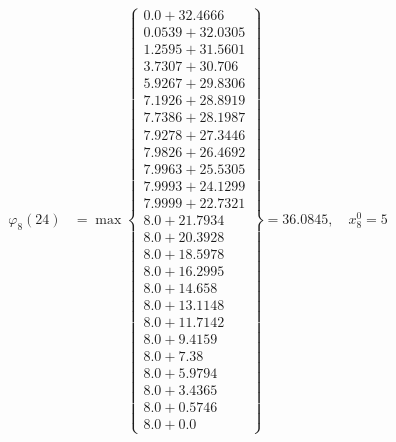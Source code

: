 \documentclass{article}
\begin{document}
\begin{align*}
\varphi_{8}(24) &= \max \left\{ \begin{array}{c}
0.0 + 32.4666 \\
 0.0539 + 32.0305 \\
 1.2595 + 31.5601 \\
 3.7307 + 30.706 \\
 5.9267 + 29.8306 \\
 7.1926 + 28.8919 \\
 7.7386 + 28.1987 \\
 7.9278 + 27.3446 \\
 7.9826 + 26.4692 \\
 7.9963 + 25.5305 \\
 7.9993 + 24.1299 \\
 7.9999 + 22.7321 \\
 8.0 + 21.7934 \\
 8.0 + 20.3928 \\
 8.0 + 18.5978 \\
 8.0 + 16.2995 \\
 8.0 + 14.658 \\
 8.0 + 13.1148 \\
 8.0 + 11.7142 \\
 8.0 + 9.4159 \\
 8.0 + 7.38 \\
 8.0 + 5.9794 \\
 8.0 + 3.4365 \\
 8.0 + 0.5746 \\
 8.0 + 0.0
\end{array} \right\}=36.0845, \quad x_{8}^0=5\\
  

\end{align*}
\end{document}

